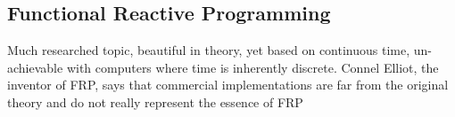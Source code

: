 
\subsection{Functional Reactive Programming}
Much researched topic, beautiful in theory, yet based on continuous time, un-achievable with computers where time is inherently discrete. Connel Elliot, the inventor of FRP, says that commercial implementations are far from the original theory and do not really represent the essence of FRP